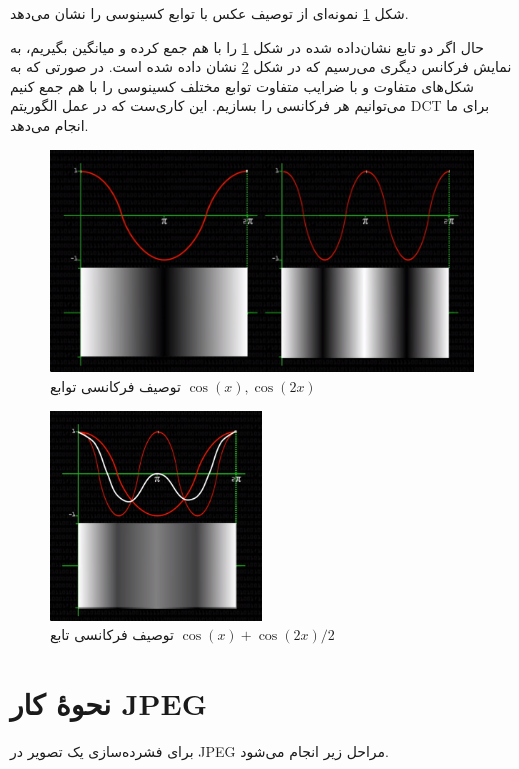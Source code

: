 شکل
\ref{freq_1}
نمونه‌ای از توصیف عکس با توابع کسینوسی را نشان می‌دهد.

حال اگر دو تابع نشان‌داده شده در 
شکل 
\ref{freq_1}
را با هم جمع کرده و میانگین بگیریم، به نمایش فرکانس دیگری می‌رسیم که در شکل 
\ref{freq_2}
نشان داده شده است.
در صورتی که به شکل‌های متفاوت و با ضرایب متفاوت توابع مختلف کسینوسی را با هم جمع کنیم می‌توانیم هر فرکانسی را بسازیم. این کاری‌ست که در 
عمل الگوریتم 
DCT برای ما انجام می‌دهد.
\begin{figure}[]
        \centering
        \includegraphics[width=\textwidth]{figs/freq_1.png}
        \caption[توصیف فرکانسی توابع 
        $\cos (x) , \cos (2x)$]{توصیف فرکانسی توابع 
        $\cos (x) , \cos (2x)$ \cite{youtube}}
        \label{freq_1}
\end{figure}

\begin{figure}[]
        \centering
        \includegraphics[width=0.5\textwidth]{figs/freq_2.png}
        \caption[توصیف فرکانسی تابع 
        $\cos (x) + \cos (2x) / 2$]{توصیف فرکانسی تابع 
        $\cos (x) + \cos (2x) / 2$ \cite{youtube}}
        \label{freq_2}
\end{figure}

\section{نحوهٔ کار JPEG}
برای فشرده‌سازی یک تصویر در JPEG 
مراحل زیر انجام می‌شود. 

